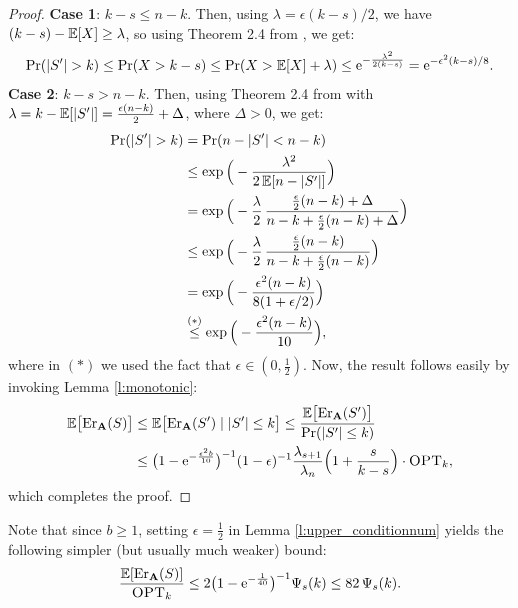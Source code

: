 \documentclass{article}
\begin{document}
\begin{proof}
\textbf{Case 1}: $k-s\leq n-k$. Then, using $\lambda=\epsilon(k-s)/2$,
we have $(k-s)-\mathbb E[X]\geq \lambda$, so using Theorem 2.4
from \citet{ChungLu2006book}, we get:
\begin{align*}
  \Pr(|S'|>k)\leq \Pr(X>k-s)\leq \Pr(X>\E[X]+\lambda)\leq
  \ee^{-\frac{\lambda^2}{2(k-s)}}
  =\ee^{-\epsilon^2(k-s)/8}.
\end{align*}
\textbf{Case 2}: $k-s>n-k$. Then, using Theorem 2.4
from \citet{ChungLu2006book} with $\lambda=k-\mathbb E[|S'|]=\frac{\epsilon(n-k)}2
+ \Delta$, where $\Delta>0$, we get:
\begin{align*}
  \Pr(|S'|>k)
  &= \Pr(n-|S'|<n-k)\\
 &\leq \exp\Big(-\frac{\lambda^2}{2\,\E[n-|S'|]}\Big) \\
  &=\exp\Big(-\frac\lambda2\,\frac{\frac\epsilon2(n-k)
    + \Delta}{n-k+\frac\epsilon2(n-k)+\Delta}\Big)\\
  &\leq\exp\Big(-\frac\lambda2\,\frac{\frac\epsilon2(n-k)}
    {n-k+\frac\epsilon2(n-k)}\Big)\\
  &=\exp\Big(-\frac{\epsilon^2(n-k)}{8(1+\epsilon/2)}\Big)\\
  &\overset{(*)}{\leq} \exp\Big(-\frac{\epsilon^2(n-k)}{10}\Big),
\end{align*}
where in $(*)$ we used the fact that $\epsilon\in(0,\frac12)$. Now,
the result follows easily by invoking Lemma \ref{l:monotonic}:
\begin{align*}
    \mathbb E\big[\mathrm{Er}_\mathbf A(S)\big] &\leq \mathbb E\big[\mathrm{Er}_\mathbf A(S')\mid|S'|\leq k\big]
  \leq \frac{\mathbb E\big[\mathrm{Er}_\mathbf A(S')\big]}{\mathrm{Pr}(|S'|\leq k)}
  \\
  &\leq \big(1-\mathrm{e}^{-\frac{\epsilon^2b}{10}}\big)^{-1}(1-\epsilon)^{-1}
\frac{\lambda_{s+1}}{\lambda_n}\Big(1+\frac s{k-s}\Big)\cdot{\textsc{OPT}_k},
\end{align*}
which completes the proof.
\end{proof}
Note that since $b\geq 1$, setting $\epsilon=\frac12$ in Lemma
\ref{l:upper_conditionnum} yields the following simpler (but usually
much weaker) bound:
\begin{align*}
  \frac{\mathbb E[\mathrm{Er}_\mathbf A(S)]}{{\textsc{OPT}_k}}
  \leq
  2\big(1-\mathrm{e}^{-\frac1{40}}\big)^{-1}\Psi_s(k)
  \leq 82\, \Psi_s(k).
\end{align*}
\end{document}
